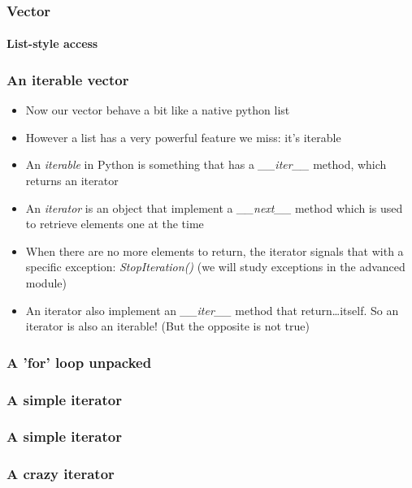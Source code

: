 \documentclass[9pt]{beamer}
\begin{document}
\begin{frame}
  \frametitle{Vector}
  \framesubtitle{List-style access}
  
\end{frame}


\begin{frame}
  \frametitle{An iterable vector}
  
  \begin{itemize}
    \item Now our vector behave a bit like a native python list
    \medskip
    \item However a list has a very powerful feature we miss: it's \alert{iterable}
    \medskip
    \item An \emph{iterable} in Python is something that has a \emph{\_\_iter\_\_}
          method, which returns an \alert{iterator}
    \medskip
    \item An \emph{iterator} is an object that implement a \emph{\_\_next\_\_} method
          which is used to retrieve elements one at the time
    \medskip
    \item When there are no more elements to return, the iterator signals that with a specific
          \alert{exception}: \emph{StopIteration()} (we will study exceptions in the advanced module)
    \medskip
    \item An iterator also implement an \emph{\_\_iter\_\_} method that return\dots itself.
          So an iterator is also an iterable! (But the opposite is not true)
  \end{itemize}
  
\end{frame}


\begin{frame}
  \frametitle{A 'for' loop unpacked}
  
\end{frame}



\begin{frame}
  \frametitle{A simple iterator}
  
\end{frame}


\begin{frame}
  \frametitle{A simple iterator}
  
\end{frame}


\begin{frame}
  \frametitle{A crazy iterator}
  
\end{frame}
\end{document}
